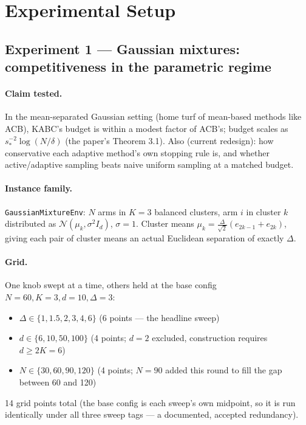 \documentclass[11pt]{article}
\begin{document}
\tableofcontents

\section{Experimental Setup}

\subsection{Experiment 1 --- Gaussian mixtures: competitiveness in the parametric regime}

\paragraph{Claim tested.} In the mean-separated Gaussian setting (home turf of
mean-based methods like ACB), KABC's budget is within a modest factor of ACB's;
budget scales as $s_*^{-2}\log(N/\delta)$ (the paper's Theorem 3.1). Also
(current redesign): how conservative each adaptive method's own stopping
rule is, and whether active/adaptive sampling beats naive uniform sampling
at a matched budget.

\paragraph{Instance family.} \texttt{GaussianMixtureEnv}: $N$ arms in $K=3$ balanced
clusters, arm $i$ in cluster $k$ distributed as $\mathcal{N}(\mu_k, \sigma^2 I_d)$,
$\sigma=1$. Cluster means $\mu_k = \frac{\Delta}{\sqrt2}(e_{2k-1}+e_{2k})$, giving each
pair of cluster means an actual Euclidean separation of exactly $\Delta$.

\paragraph{Grid.} One knob swept at a time, others held at the base config
$N{=}60, K{=}3, d{=}10, \Delta{=}3$:
\begin{itemize}
  \item $\Delta \in \{1, 1.5, 2, 3, 4, 6\}$ (6 points --- the headline sweep)
  \item $d \in \{6, 10, 50, 100\}$ (4 points; $d=2$ excluded, construction requires $d \ge 2K=6$)
  \item $N \in \{30, 60, 90, 120\}$ (4 points; $N=90$ added this round to fill
    the gap between 60 and 120)
\end{itemize}
14 grid points total (the base config is each sweep's own midpoint, so it
is run identically under all three sweep tags --- a documented, accepted
redundancy).
\end{document}
